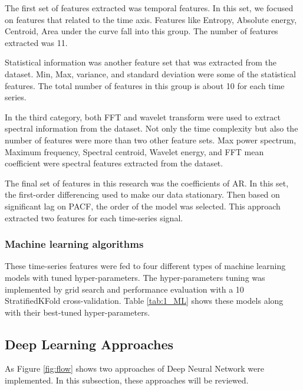 The first set of features extracted was temporal features. In this set, we focused on features that related to the time axis. Features like Entropy, Absolute energy, Centroid, Area under the curve fall into this group. The number of features extracted was 11.

Statistical information was another feature set that was extracted from the dataset. Min, Max, variance, and standard deviation were some of the statistical features. The total number of features in this group is about 10 for each time series.  

In the third category, both FFT and wavelet transform were used to extract spectral information from the dataset. Not only the time complexity but also the number of features were more than two other feature sets. 
Max power spectrum, Maximum frequency, Spectral centroid, Wavelet energy, and FFT mean coefficient were spectral features extracted from the dataset.

The final set of features in this research was the coefficients of \gls{AR}. In this set, the first-order differencing used to make our data stationary. Then based on significant lag on \gls{PACF}, the order of the model  was selected. This approach extracted two features for each time-series signal.

\subsubsection{Machine learning algorithms}

These time-series features were fed to four different types of machine learning models with tuned hyper-parameters. The hyper-parameters tuning was implemented by grid search and performance evaluation with a 10  StratifiedKFold cross-validation. Table \ref{tab:1_ML} shows these models along with their best-tuned hyper-parameters.

\subsection{Deep Learning Approaches}
  
As Figure \ref{fig:flow} shows two approaches of Deep Neural Network were implemented. In this subsection, these approaches will be reviewed.


